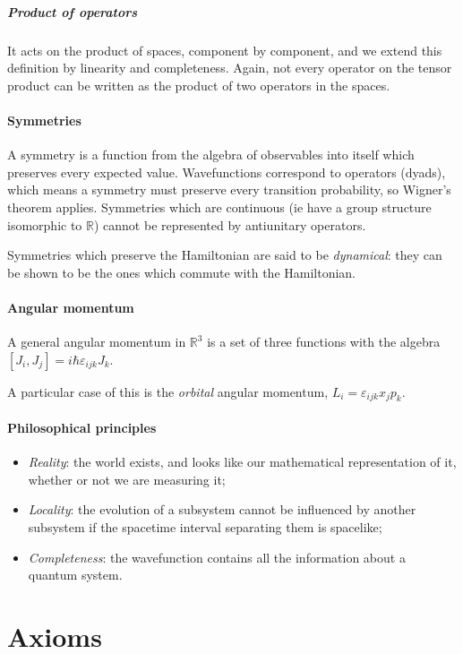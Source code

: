 \documentclass[main.tex]{subfiles}
\begin{document}
\subparagraph{Product of operators} It acts on the product of spaces, component by component, and we extend this definition by linearity and completeness.
Again, not every operator on the tensor product can be written as the product of two operators in the spaces.

\paragraph{Symmetries} A symmetry is a function from the algebra of observables into itself which preserves every expected value.
Wavefunctions correspond to operators (dyads), which means a symmetry must preserve every transition probability, so Wigner's theorem applies.
Symmetries which are continuous (ie have a group structure isomorphic to $\mathbb{R}$) cannot be represented by antiunitary operators.

Symmetries which preserve the Hamiltonian are said to be \emph{dynamical}: they can be shown to be the ones which commute with the Hamiltonian.

\paragraph{Angular momentum} A general angular momentum in $\mathbb{R}^3$ is a set of three functions with the algebra $[J_i, J_j] = i \hbar \varepsilon_{ijk}J_k$.

A particular case of this is the \emph{orbital} angular momentum, $L_i = \varepsilon_{ijk} x_j p_k$.

\paragraph{Philosophical principles}

\begin{itemize}
    \item \emph{Reality}: the world exists, and looks like our mathematical representation of it, whether or not we are measuring it;
    \item \emph{Locality}: the evolution of a subsystem cannot be influenced by another subsystem if the spacetime interval separating them is spacelike;
    \item \emph{Completeness}: the wavefunction contains all the information about a quantum system.
\end{itemize}

\section{Axioms}
\end{document}
